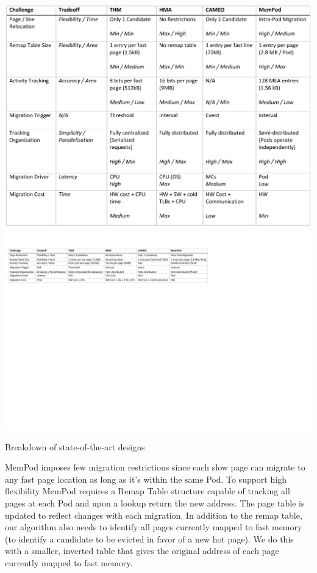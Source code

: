 \begin{table}[t]
  \ifOldResults
  \includegraphics[width=\linewidth]{figures/comparison_table.pdf}
  \else
  \includegraphics[width=\textwidth]{figures/revised/new/comparison_table.pdf}
  \fi
  \caption{Breakdown of state-of-the-art designs}
  \label{tbl:breakdown}
\end{table}

MemPod imposes few migration restrictions since each slow page can migrate to any fast page location as long as it's within the same Pod. To support high flexibility MemPod requires a Remap Table structure capable of tracking all pages at each Pod and upon a lookup return the new address. The page table is updated to reflect changes with each migration. In addition to the remap table, our algorithm also needs to identify all pages currently mapped to fast memory (to identify a candidate to be evicted in favor of a new hot page). We do this with a smaller, inverted table that gives the original address of each page currently mapped to fast memory.

